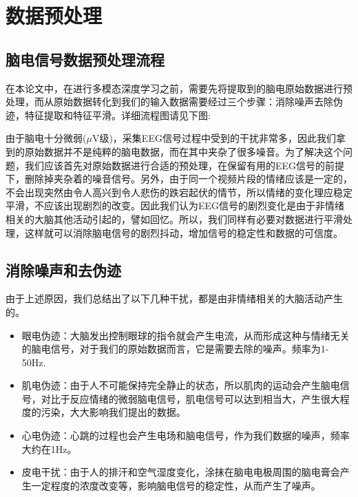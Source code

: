 
\chapter{数据预处理}
\label{chap:chap3}

\section{脑电信号数据预处理流程}
	在本论文中，在进行多模态深度学习之前，需要先将提取到的脑电原始数据进行预处理，而从原始数据转化到我们的输入数据需要经过三个步骤：消除噪声去除伪迹，特征提取和特征平滑。详细流程图请见下图:
	
	由于脑电十分微弱($\mu$V级)，采集EEG信号过程中受到的干扰非常多，因此我们拿到的原始数据并不是纯粹的脑电数据，而在其中夹杂了很多噪音。为了解决这个问题，我们应该首先对原始数据进行合适的预处理，在保留有用的EEG信号的前提下，删除掉夹杂着的噪音信号。另外，由于同一个视频片段的情绪应该是一定的，不会出现突然由令人高兴到令人悲伤的跌宕起伏的情节，所以情绪的变化理应稳定平滑，不应该出现剧烈的改变。因此我们认为EEG信号的剧烈变化是由于非情绪相关的大脑其他活动引起的，譬如回忆。所以，我们同样有必要对数据进行平滑处理，这样就可以消除脑电信号的剧烈抖动，增加信号的稳定性和数据的可信度。
\section{消除噪声和去伪迹}
	由于上述原因，我们总结出了以下几种干扰，都是由非情绪相关的大脑活动产生的。
	\begin{itemize}
	\item 眼电伪迹：大脑发出控制眼球的指令就会产生电流，从而形成这种与情绪无关的脑电信号，对于我们的原始数据而言，它是需要去除的噪声。频率为1-50Hz.
	\item 肌电伪迹：由于人不可能保持完全静止的状态，所以肌肉的运动会产生脑电信号，对比于反应情绪的微弱脑电信号，肌电信号可以达到相当大，产生很大程度的污染，大大影响我们提出的数据。
	\item 心电伪迹：心跳的过程也会产生电场和脑电信号，作为我们数据的噪声，频率大约在1Hz。
	\item 皮电干扰：由于人的排汗和空气湿度变化，涂抹在脑电电极周围的脑电膏会产生一定程度的浓度改变等，影响脑电信号的稳定性，从而产生了噪声。
	\end{itemize}
	
